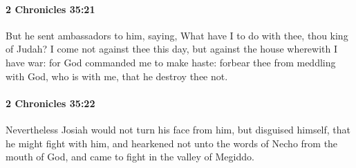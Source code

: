 		\paragraph{2 Chronicles 35:21} %
			\label{2CHRONICLES-35-21}

			But he sent ambassadors to him, saying, What have I to do with thee, thou king of Judah? I come not against thee this day, but against the house wherewith I have war: for God commanded me to make haste: forbear thee from meddling with God, who is with me, that he destroy thee not.


		\paragraph{2 Chronicles 35:22} %
			\label{2CHRONICLES-35-22}

			Nevertheless Josiah would not turn his face from him, but disguised himself, that he might fight with him, and hearkened not unto the words of Necho from the mouth of God, and came to fight in the valley of Megiddo.

